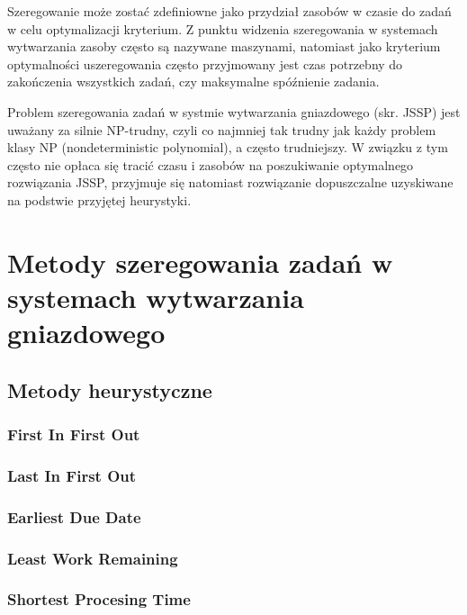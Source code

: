 \documentclass[twoside]{pracaInzynierskaMS}
\begin{document}
Szeregowanie może zostać zdefiniowne jako przydział zasobów w czasie do zadań w celu optymalizacji kryterium. Z punktu widzenia szeregowania w systemach wytwarzania zasoby często są nazywane maszynami, natomiast jako kryterium optymalności uszeregowania często przyjmowany jest czas potrzebny do zakończenia wszystkich zadań, czy maksymalne spóźnienie zadania. \cite{antColony} 

Problem szeregowania zadań w systmie wytwarzania gniazdowego (skr. JSSP) jest uważany za silnie NP-trudny, czyli co najmniej tak trudny jak każdy problem klasy NP (nondeterministic polynomial), a często trudniejszy. W związku z tym często nie opłaca się tracić czasu i zasobów na poszukiwanie optymalnego rozwiązania JSSP, przyjmuje się natomiast rozwiązanie dopuszczalne uzyskiwane na podstwie przyjętej heurystyki. 
 

\section        [Metody szeregowania zadań \ldots]
		         {Metody szeregowania zadań \newline w systemach wytwarzania gniazdowego}

\subsection     {Metody heurystyczne}
\subsubsection  {First In First Out}

\subsubsection  {Last In First Out}

\subsubsection  {Earliest Due Date}

\subsubsection  {Least Work Remaining}

\subsubsection  {Shortest Procesing Time}
\end{document}
